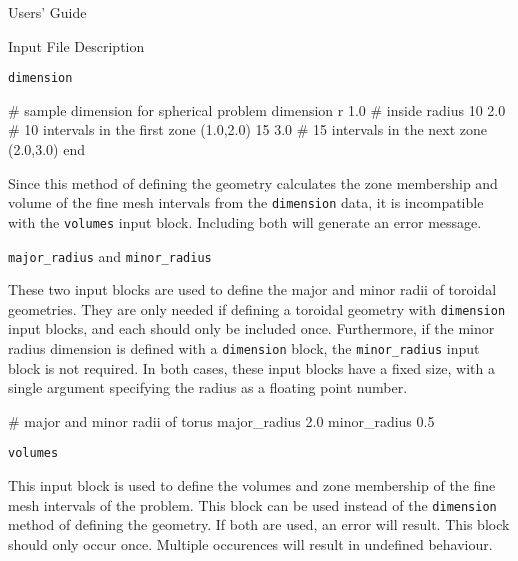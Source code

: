 \begin{chapter}{Users' Guide\label{app:user.guide}}
\begin{section}{Input File Description\label{app:user.input}}
\begin{subsection}{\texttt{dimension}\label{app:user.input.dim}}
      \begin{center}
        \renewcommand{\baselinestretch}{1}\normalsize
        \begin{boxedverbatim}
# sample dimension for spherical problem 
dimension r 1.0      # inside radius 
         10 2.0      # 10 intervals in the first zone (1.0,2.0)
         15 3.0      # 15 intervals in the next zone (2.0,3.0) 
end
\end{boxedverbatim}
      \end{center}

      Since this method of defining the geometry calculates the zone
      membership and volume of the fine mesh intervals from the
      \texttt{dimension} data, it is incompatible with the
      \texttt{volumes} input block.  Including both will generate an
      error message.
    \end{subsection}

    \begin{subsection}{\texttt{major\_radius} and  \texttt{minor\_radius} \label{app:user.input.tor_radii}}
      
      These two input blocks are used to define the major and minor
      radii of toroidal geometries.  They are only needed if defining
      a toroidal geometry with \texttt{dimension} input blocks, and
      each should only be included once.  Furthermore, if the minor
      radius dimension is defined with a \texttt{dimension} block, the
      \texttt{minor\_radius} input block is not required.  In both
      cases, these input blocks have a fixed size, with a single
      argument specifying the radius as a floating point number.

      \begin{center}
        \renewcommand{\baselinestretch}{1}\normalsize
        \begin{boxedverbatim}
# major and minor radii of torus
major_radius     2.0
minor_radius     0.5          
\end{boxedverbatim}
      \end{center}

    \end{subsection}

    \begin{subsection}{\texttt{volumes}\label{app:user.input.vol}}
      
      This input block is used to define the volumes and zone
      membership of the fine mesh intervals of the problem.  This
      block can be used instead of the \texttt{dimension} method of
      defining the geometry.  If both are used, an error will result.
      This block should only occur once.  Multiple occurences will
      result in undefined behaviour.


\end{subsection}
\end{section}
\end{chapter}

